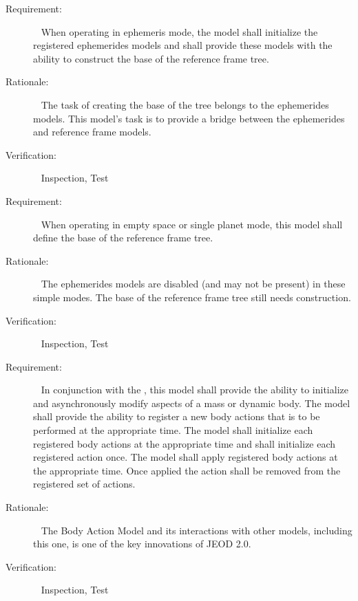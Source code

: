 \label{reqt:ephem}
\begin{description}
\item[Requirement:]\ \newline
  When operating in ephemeris mode,
  the model shall initialize the registered ephemerides models
  and shall provide these models with the ability to construct
  the base of the reference frame tree.
\item[Rationale:]\ \newline
  The task of creating the base of the tree belongs to the ephemerides models.
  This model's task is to provide a bridge between the ephemerides and
  reference frame models.
\item[Verification:]\ \newline
  Inspection, Test
\end{description}

\label{reqt:ephem_free}
\begin{description}
\item[Requirement:]\ \newline
  When operating in empty space or single planet mode, this
  model shall define the base of the reference frame tree.
\item[Rationale:]\ \newline
  The ephemerides models are disabled (and may not be present)
  in these simple modes.
  The base of the reference frame tree still needs construction.
\item[Verification:]\ \newline
  Inspection, Test
\end{description}

\label{reqt:body_actions}
\begin{description}
\item[Requirement:]\ \newline
  In conjunction with the ,
  this model shall provide the ability to initialize and asynchronously
  modify aspects of a mass or dynamic body.
  \label{reqt:add_body_action}
  The model shall provide the ability to register a new body actions that is
  to be performed at the appropriate time.
  \label{reqt:initialize_body_action}
  The model shall initialize each registered body actions at the
  appropriate time and shall initialize each registered action once.
  \label{reqt:apply_body_action}
  The model shall apply registered body actions at the appropriate time.
  Once applied the action shall be removed from the registered set of actions.
\item[Rationale:]\ \newline
  The Body Action Model and its interactions with other models,
  including this one, is one of the key innovations of JEOD 2.0.
\item[Verification:]\ \newline
  Inspection, Test
\end{description}

